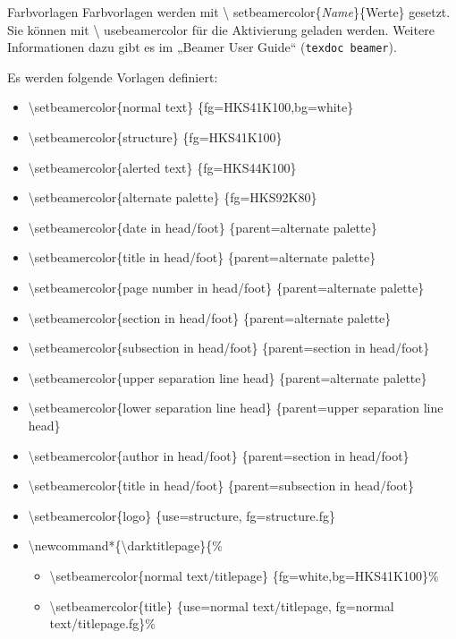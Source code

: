 \documentclass[presentation,t]{beamer}
\begin{document}
\begin{frame}[label=sec-2-5-2]{Farbvorlagen}
Farbvorlagen werden mit \textbackslash
setbeamercolor\{\emph{Name}\}\{Werte\} gesetzt. Sie können mit \textbackslash
usebeamercolor für die Aktivierung geladen werden. Weitere Informationen dazu gibt es im
„Beamer User Guide“ (\texttt{texdoc beamer}).

Es werden folgende Vorlagen definiert:
\begin{itemize}
\item \textbackslash setbeamercolor\{normal text\} \{fg=HKS41K100,bg=white\}
\item \textbackslash setbeamercolor\{structure\} \{fg=HKS41K100\}
\item \textbackslash setbeamercolor\{alerted text\} \{fg=HKS44K100\}
\item \textbackslash setbeamercolor\{alternate palette\} \{fg=HKS92K80\}
\item \textbackslash setbeamercolor\{date in head/foot\} \{parent=alternate palette\}
\item \textbackslash setbeamercolor\{title in head/foot\} \{parent=alternate palette\}
\item \textbackslash setbeamercolor\{page number in head/foot\} \{parent=alternate palette\}
\item \textbackslash setbeamercolor\{section in head/foot\} \{parent=alternate palette\}
\item \textbackslash setbeamercolor\{subsection in head/foot\} \{parent=section in head/foot\}
\item \textbackslash setbeamercolor\{upper separation line head\} \{parent=alternate palette\}
\item \textbackslash setbeamercolor\{lower separation line head\} \{parent=upper separation line head\}
\item \textbackslash setbeamercolor\{author in head/foot\} \{parent=section in head/foot\}
\item \textbackslash setbeamercolor\{title in head/foot\} \{parent=subsection in head/foot\}
\item \textbackslash setbeamercolor\{logo\} \{use=structure, fg=structure.fg\}
\item \textbackslash newcommand*\{\textbackslash darktitlepage\}\{\%
\begin{itemize}
\item \textbackslash setbeamercolor\{normal text/titlepage\} \{fg=white,bg=HKS41K100\}\%
\item \textbackslash setbeamercolor\{title\} \{use=normal text/titlepage, fg=normal text/titlepage.fg\}\%

\end{itemize}
\end{itemize}
\end{frame}
\end{document}
